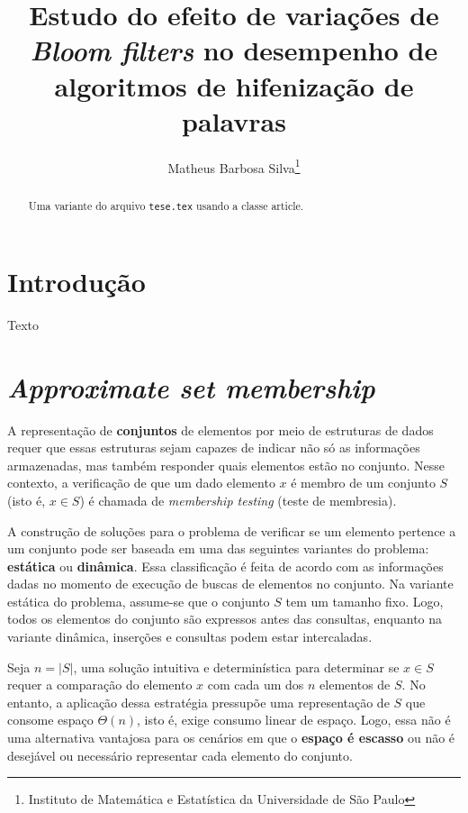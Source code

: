 \documentclass[12pt,twoside,english,brazilian]{article}
\title{Estudo do efeito de variações de \textit{Bloom filters} no desempenho de algoritmos de hifenização de palavras}
\author{
  Matheus Barbosa Silva\thanks{Instituto de Matemática e Estatística da Universidade de São Paulo}
}
\date{}
\begin{document}
\maketitle

\begin{abstract}
  Uma variante do arquivo \texttt{tese.tex} usando a classe \textsf{article}.
\end{abstract}

\section{Introdução}

Texto

\newpage

\tableofcontents

\newpage

\section{\textit{Approximate set membership}}

A representação de \textbf{conjuntos} de elementos por meio de estruturas de dados requer que essas estruturas sejam capazes de indicar não só as informações armazenadas, mas também responder quais elementos estão no conjunto. Nesse contexto, a verificação de que um dado elemento $x$ é membro de um conjunto $S$ (isto é, $x \in S$) é chamada de \textit{membership testing} (teste de membresia).

A construção de soluções para o problema de verificar se um elemento pertence a um conjunto pode ser baseada em uma das seguintes variantes do problema: \textbf{estática} ou \textbf{dinâmica}. Essa classificação é feita de acordo com as informações dadas no momento de execução de buscas de elementos no conjunto. Na variante estática do problema, assume-se que o conjunto $S$ tem um tamanho fixo. Logo, todos os elementos do conjunto são expressos antes das consultas, enquanto na variante dinâmica, inserções e consultas podem estar intercaladas.

Seja $n = |S|$, uma solução intuitiva e determinística para determinar se $x \in S$ requer a comparação do elemento $x$ com cada um dos $n$ elementos de $S$. No entanto, a aplicação dessa estratégia pressupõe uma representação de $S$ que consome espaço $\Theta(n)$, isto é, exige consumo linear de espaço. Logo, essa não é uma alternativa vantajosa para os cenários em que o \textbf{espaço é escasso} ou não é desejável ou necessário representar cada elemento do conjunto.
\end{document}
